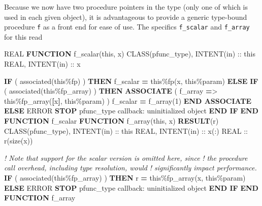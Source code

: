 \documentclass[
]{scrartcl}
\newenvironment{Shaded}{}{}
\newcommand{\CommentTok}[1]{\textcolor[rgb]{0.38,0.63,0.69}{\textit{#1}}}
\newcommand{\DataTypeTok}[1]{\textcolor[rgb]{0.56,0.13,0.00}{#1}}
\newcommand{\DecValTok}[1]{\textcolor[rgb]{0.25,0.63,0.44}{#1}}
\newcommand{\FunctionTok}[1]{\textcolor[rgb]{0.02,0.16,0.49}{#1}}
\newcommand{\KeywordTok}[1]{\textcolor[rgb]{0.00,0.44,0.13}{\textbf{#1}}}
\newcommand{\NormalTok}[1]{#1}
\newcommand{\OperatorTok}[1]{\textcolor[rgb]{0.40,0.40,0.40}{#1}}
\newcommand{\StringTok}[1]{\textcolor[rgb]{0.25,0.44,0.63}{#1}}
\begin{document}
Because we now have two procedure pointers in the type (only one of
which is used in each given object), it is advantageous to provide a
generic type-bound procedure \texttt{f} as a front end for ease of use.
The specifics \texttt{f\_scalar} and \texttt{f\_array} for this read

\begin{Shaded}
\begin{Highlighting}[]
\DataTypeTok{REAL} \KeywordTok{FUNCTION}\NormalTok{ f\_scalar(this, x)}
   \DataTypeTok{CLASS(pfunc\_type)}\NormalTok{, }\DataTypeTok{INTENT(in)} \DataTypeTok{::}\NormalTok{ this}
   \DataTypeTok{REAL}\NormalTok{, }\DataTypeTok{INTENT(in)} \DataTypeTok{::}\NormalTok{ x}

   \KeywordTok{IF}\NormalTok{ ( }\FunctionTok{associated}\NormalTok{(this}\OperatorTok{\%}\NormalTok{fp) ) }\KeywordTok{THEN}
\NormalTok{      f\_scalar }\KeywordTok{=}\NormalTok{ this}\OperatorTok{\%}\NormalTok{fp(x, this}\OperatorTok{\%}\NormalTok{param)}
   \KeywordTok{ELSE} \KeywordTok{IF}\NormalTok{ ( }\FunctionTok{associated}\NormalTok{(this}\OperatorTok{\%}\NormalTok{fp\_array) ) }\KeywordTok{THEN}
      \KeywordTok{ASSOCIATE}\NormalTok{ ( f\_array }\KeywordTok{=}\OperatorTok{\textgreater{}}\NormalTok{ this}\OperatorTok{\%}\NormalTok{fp\_array(}\KeywordTok{[}\NormalTok{x}\KeywordTok{]}\NormalTok{, this}\OperatorTok{\%}\NormalTok{param) )}
\NormalTok{         f\_scalar }\KeywordTok{=}\NormalTok{ f\_array(}\DecValTok{1}\NormalTok{)}
      \KeywordTok{END ASSOCIATE}
   \KeywordTok{ELSE}
\NormalTok{      ERROR }\KeywordTok{STOP} \StringTok{\textquotesingle{}pfunc\_type callback: uninitialized object\textquotesingle{}}
   \KeywordTok{END IF}
\KeywordTok{END FUNCTION}\NormalTok{ f\_scalar}
\KeywordTok{FUNCTION}\NormalTok{ f\_array(this, x) }\KeywordTok{RESULT}\NormalTok{(r)}
   \DataTypeTok{CLASS(pfunc\_type)}\NormalTok{, }\DataTypeTok{INTENT(in)} \DataTypeTok{::}\NormalTok{ this}
   \DataTypeTok{REAL}\NormalTok{, }\DataTypeTok{INTENT(in)} \DataTypeTok{::}\NormalTok{ x(:)}
   \DataTypeTok{REAL} \DataTypeTok{::}\NormalTok{ r(}\FunctionTok{size}\NormalTok{(x))}

   \CommentTok{! Note that support for the scalar version is omitted here, since}
   \CommentTok{! the procedure call overhead, including type resolution, would}
   \CommentTok{! significantly impact performance.}
   \KeywordTok{IF}\NormalTok{ ( }\FunctionTok{associated}\NormalTok{(this}\OperatorTok{\%}\NormalTok{fp\_array) ) }\KeywordTok{THEN}
\NormalTok{      r }\KeywordTok{=}\NormalTok{ this}\OperatorTok{\%}\NormalTok{fp\_array(x, this}\OperatorTok{\%}\NormalTok{param)}
   \KeywordTok{ELSE}
\NormalTok{      ERROR }\KeywordTok{STOP} \StringTok{\textquotesingle{}pfunc\_type callback: uninitialized object\textquotesingle{}}
   \KeywordTok{END IF}
\KeywordTok{END FUNCTION}\NormalTok{ f\_array}
\end{Highlighting}
\end{Shaded}
\end{document}
